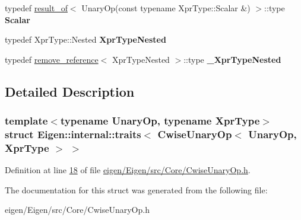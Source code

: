 \begin{DoxyCompactItemize}
typedef \hyperlink{struct_eigen_1_1internal_1_1result__of}{result\+\_\+of}$<$ Unary\+Op(const typename Xpr\+Type\+::\+Scalar \&) $>$\+::type {\bfseries Scalar}
\item 
\mbox{\label{struct_eigen_1_1internal_1_1traits_3_01_cwise_unary_op_3_01_unary_op_00_01_xpr_type_01_4_01_4_a2f68010027de6207c504d0c746f79c17}} 
typedef Xpr\+Type\+::\+Nested {\bfseries Xpr\+Type\+Nested}
\item 
\mbox{\label{struct_eigen_1_1internal_1_1traits_3_01_cwise_unary_op_3_01_unary_op_00_01_xpr_type_01_4_01_4_a0dab38d6ea8d87fa71fc30c858034b02}} 
typedef \hyperlink{struct_eigen_1_1internal_1_1remove__reference}{remove\+\_\+reference}$<$ Xpr\+Type\+Nested $>$\+::type {\bfseries \+\_\+\+Xpr\+Type\+Nested}
\end{DoxyCompactItemize}


\subsection{Detailed Description}
\subsubsection*{template$<$typename Unary\+Op, typename Xpr\+Type$>$\newline
struct Eigen\+::internal\+::traits$<$ Cwise\+Unary\+Op$<$ Unary\+Op, Xpr\+Type $>$ $>$}



Definition at line \hyperlink{eigen_2_eigen_2src_2_core_2_cwise_unary_op_8h_source_l00018}{18} of file \hyperlink{eigen_2_eigen_2src_2_core_2_cwise_unary_op_8h_source}{eigen/\+Eigen/src/\+Core/\+Cwise\+Unary\+Op.\+h}.



The documentation for this struct was generated from the following file\+:\begin{DoxyCompactItemize}
\item 
eigen/\+Eigen/src/\+Core/\+Cwise\+Unary\+Op.\+h\end{DoxyCompactItemize}

